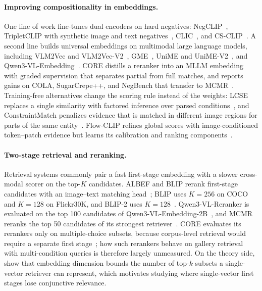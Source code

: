 \paragraph{Improving compositionality in embeddings.}
One line of work fine-tunes dual encoders on hard negatives: NegCLIP~\cite{aro2023}, TripletCLIP with synthetic image and text negatives~\cite{tripletclip2024}, CLIC~\cite{clic2025}, and CS-CLIP~\cite{halftruths2026}.
A second line builds universal embeddings on multimodal large language models, including VLM2Vec and VLM2Vec-V2~\cite{vlm2vec2025,vlm2vecv22025}, GME~\cite{gme2025}, UniME and UniME-V2~\cite{unime2025,unimev22025}, and Qwen3-VL-Embedding~\cite{qwen3vlemb2026}.
CORE distills a reranker into an MLLM embedding with graded supervision that separates partial from full matches, and reports gains on COLA, SugarCrepe++, and NegBench that transfer to MCMR~\cite{core2026}.
Training-free alternatives change the scoring rule instead of the weights: LCSE replaces a single similarity with factored inference over parsed conditions~\cite{lcse2026}, and ConstraintMatch penalizes evidence that is matched in different image regions for parts of the same entity~\cite{constraintmatch2026}.
Flow-CLIP refines global scores with image-conditioned token--patch evidence but learns its calibration and ranking components~\cite{flowclip2026}.

\paragraph{Two-stage retrieval and reranking.}
Retrieval systems commonly pair a fast first-stage embedding with a slower cross-modal scorer on the top-$K$ candidates.
ALBEF and BLIP rerank first-stage candidates with an image--text matching head~\cite{albef2021,blip2022}; BLIP uses $K{=}256$ on COCO and $K{=}128$ on Flickr30K, and BLIP-2 uses $K{=}128$~\cite{blip22023}.
Qwen3-VL-Reranker is evaluated on the top 100 candidates of Qwen3-VL-Embedding-2B~\cite{qwen3vlemb2026}, and MCMR reranks the top 50 candidates of its strongest retriever~\cite{mcmr2026}.
CORE evaluates its rerankers only on multiple-choice subsets, because corpus-level retrieval would require a separate first stage~\cite{core2026}; how such rerankers behave on gallery retrieval with multi-condition queries is therefore largely unmeasured.
On the theory side, \citet{limit2025} show that embedding dimension bounds the number of top-$k$ subsets a single-vector retriever can represent, which motivates studying where single-vector first stages lose conjunctive relevance.
